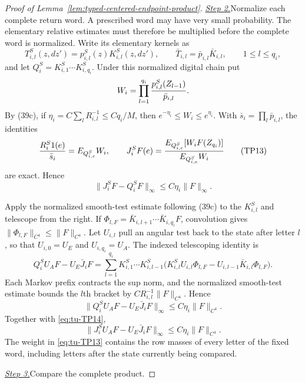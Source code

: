 \begin{proof}[Proof of Lemma~\ref{lem:typed-centered-endpoint-product}]
\smallskip\noindent
\underline{\textit{Step 2.}}\quad Normalize each complete return word.
A prescribed word may have very small probability. The elementary
relative estimates must therefore be multiplied before the complete word
is normalized. Write its elementary kernels as
\[
 T_{i,l}^S(z,dz')=p_{i,l}^S(z)K_{i,l}^S(z,dz'),\qquad
 \bar T_{i,l}=\bar p_{i,l}\bar K_{i,l},\qquad1\le l\le q_i,
\]
and let \(Q_i^S=K_{i,1}^S\cdots K_{i,q_i}^S\).  Under this normalized
digital chain put
\[
 W_i=\prod_{l=1}^{q_i}{p_{i,l}^S(Z_{l-1})\over\bar p_{i,l}}.
\]
By (39c), if \(\eta_i=C\sum_lR_{i,l}^{-1}\le Cq_i/M\), then
\(e^{-\eta_i}\le W_i\le e^{\eta_i}\).  With
\(\bar s_i=\prod_l\bar p_{i,l}\), the identities
\begin{equation}
 {R_i^S1(e)\over\bar s_i}=E_{Q_{i,e}^S}W_i,\qquad
 J_i^SF(e)={E_{Q_{i,e}^S}[W_iF(Z_{q_i})]
                 \over E_{Q_{i,e}^S}W_i}                  \tag{TP13}\label{eq:tu-TP13}
\end{equation}
are exact.  Hence
\begin{equation}
             \|J_i^SF-Q_i^SF\|_\infty
             \le C\eta_i\|F\|_\infty.                    \tag{TP14}\label{eq:tu-TP14}
\end{equation}

Apply the normalized smooth-test estimate following (39c) to the
\(K_{i,l}^S\) and telescope from the right.  If
\(\Phi_{l,F}=\bar K_{i,l+1}\cdots\bar K_{i,q_i}F\), convolution gives
\(\|\Phi_{l,F}\|_{C^4}\le\|F\|_{C^4}\). Let $U_{i,l}$ pull an
angular test back to the state after letter $l$, so that
$U_{i,0}=U_E$ and $U_{i,q_i}=U_A$. The indexed telescoping identity is
\[
 Q_i^SU_AF-U_E\bar J_iF
 =\sum_{l=1}^{q_i}K_{i,1}^S\cdots K_{i,l-1}^S
 \bigl(K_{i,l}^SU_{i,l}\Phi_{l,F}
       -U_{i,l-1}\bar K_{i,l}\Phi_{l,F}\bigr).
\]
Each Markov prefix contracts the sup norm, and the normalized
smooth-test estimate bounds the $l$th bracket by
$CR_{i,l}^{-1}\|F\|_{C^4}$. Hence
\[
 \|Q_i^SU_AF-U_E\bar J_iF\|_\infty
       \le C\eta_i\|F\|_{C^4}.
\]
Together with \eqref{eq:tu-TP14},
\begin{equation}
 \|J_i^SU_AF-U_E\bar J_iF\|_\infty
       \le C\eta_i\|F\|_{C^4}.                            \tag{TP15}\label{eq:tu-TP15}
\end{equation}
The weight in \eqref{eq:tu-TP13} contains the row masses of every letter of the fixed
word, including letters after the state currently being compared.

\smallskip\noindent
\underline{\textit{Step 3.}}\quad Compare the complete product.


\end{proof}
